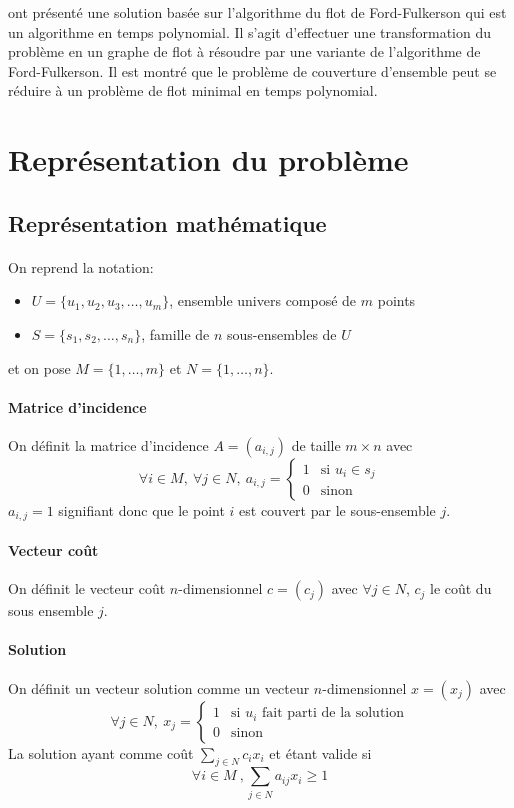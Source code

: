 \documentclass[12pt,letterpaper,twoside]{article}
\begin{document}
				\citeauthor{Afif1995} ont présenté une solution basée sur l'algorithme du flot de Ford-Fulkerson qui est un algorithme
				en temps polynomial.
				Il s'agit d'effectuer une transformation du problème en un graphe de flot à résoudre par une variante de l'algorithme
				de Ford-Fulkerson. Il est montré que le problème de couverture d'ensemble peut se réduire à un problème de flot minimal
				en temps polynomial.~\cite{Afif1995}
	\section{Représentation du problème}
		\subsection{Représentation mathématique}
			\paragraph*{}
				On reprend la notation:
				\begin{itemize}
					\item \(U = \{u_1, u_2, u_3, \dots, u_m\}\), ensemble univers composé de \(m\) points
					\item \(S = \{s_1, s_2, \dots, s_n\}\), famille de \(n\) sous-ensembles de \(U\)
				\end{itemize}
				et on pose \(M = \{1,\ldots,m\}\) et \(N = \{1,\ldots,n\}\).
			\paragraph*{Matrice d'incidence\\}
				On définit la matrice d'incidence \(A = \left(a_{i,j}\right)\) de taille \(m \times n\) avec
				\[\forall i \in M,\ \forall j \in N,\ a_{i,j} = \left\{
				    \begin{array}{ll}
				        1 & \text{si } u_i \in s_j \\
				        0 & \text{sinon}
				    \end{array}
				\right.\]
				\(a_{i,j} = 1\) signifiant donc que le point \(i\) est couvert par le sous-ensemble \(j\).
			\paragraph*{Vecteur coût\\}
				On définit le vecteur coût \(n\)-dimensionnel \(c = \left(c_j\right)\) avec \(\forall j \in N\), \(c_j\) le coût du sous ensemble \(j\).
			\paragraph*{Solution\\}
				On définit un vecteur solution comme un vecteur \(n\)-dimensionnel \(x = \left(x_j\right)\) avec
				\[\forall j \in N,\ x_j = \left\{
				    \begin{array}{ll}
				        1 & \text{si } u_i \text{ fait parti de la solution}\\
				        0 & \text{sinon}
				    \end{array}
				\right.\]
				La solution ayant comme coût \(\sum_{j \in N}{c_i x_i}\) et étant valide si
				\[\forall i \in M\ ,\sum_{j \in N}{a_{ij}x_i} \ge 1\]
\end{document}
